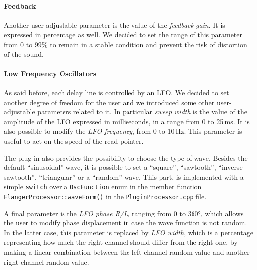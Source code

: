 \paragraph{Feedback}
Another user adjustable parameter is the value of the \emph{feedback gain}. It is expressed in percentage as well.
We decided to set the range of this parameter from 0 to 99\% to remain in a stable condition and prevent the risk of distortion of the sound.

\paragraph{Low Frequency Oscillators}
As said before, each delay line is controlled by an LFO.
We decided to set another degree of freedom for the user and we introduced some other user-adjustable parameters related to it.
In particular \emph{sweep width} is the value of the amplitude of the LFO expressed in milliseconds, in a range from 0 to 25\,ms.
It is also possible to modify the \emph{LFO frequency}, from 0 to 10\,Hz.
This parameter is useful to act on the speed of the read pointer.

The plug-in also provides the possibility to choose the type of wave.
Besides the default ``sinusoidal'' wave, it is possible to set a ``square'', ``sawtooth'', ``inverse sawtooth'', ``triangular'' or a ``random'' wave.
This part, is implemented with a simple \texttt{switch} over a \texttt{OscFunction} enum in the member function \texttt{FlangerProcessor::waveForm()} in the \texttt{PluginProcessor.cpp} file.

A final parameter is the \emph{LFO phase R/L}, ranging from 0 to 360°, which allows the user to modify phase displacement in case the wave function is not random. In the latter case, this parameter is replaced by \emph{LFO width}, which is a percentage representing how much the right channel should differ from the right one, by making a linear combination between the left-channel random value and another right-channel random value.

